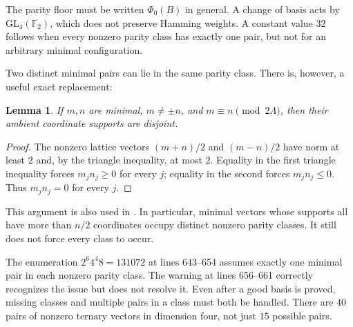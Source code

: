 \documentclass[11pt,reqno]{amsart}
\newtheorem{lemma}[theorem]{Lemma}
\theoremstyle{definition}
\begin{document}
The parity floor must be written $\Phi_0(B)$ in general. A change of
basis acts by $\mathrm{GL}_4(\mathbb F_2)$, which does not preserve
Hamming weights. A constant value $32$ follows when every nonzero
parity class has exactly one pair, but not for an arbitrary minimal
configuration.

Two distinct minimal pairs can lie in the same parity class. There is,
however, a useful exact replacement:
\begin{lemma}\label{lem:parity-support}
If $m,n$ are minimal, $m\ne\pm n$, and $m\equiv n\pmod{2\Lambda}$,
then their ambient coordinate supports are disjoint.
\end{lemma}
\begin{proof}
The nonzero lattice vectors $(m+n)/2$ and $(m-n)/2$ have norm at
least $2$ and, by the triangle inequality, at most $2$.
Equality in the first triangle inequality forces $m_jn_j\ge0$ for
every $j$; equality in the second forces $m_jn_j\le0$. Thus
$m_jn_j=0$ for every $j$.
\end{proof}
This argument is also used in \cite{MillerKissing}. In particular,
minimal vectors whose supports all have more than $n/2$ coordinates
occupy distinct nonzero parity classes. It still does not force every
class to occur.

The enumeration $2^6 4^4 8=131072$ at lines 643--654 assumes exactly
one minimal pair in each nonzero parity class. The warning at lines
656--661 correctly recognizes the issue but does not resolve it.
Even after a good basis is proved, missing classes and multiple pairs
in a class must both be handled. There are $40$ pairs of nonzero
ternary vectors in dimension four, not just $15$ possible pairs.
\end{document}
